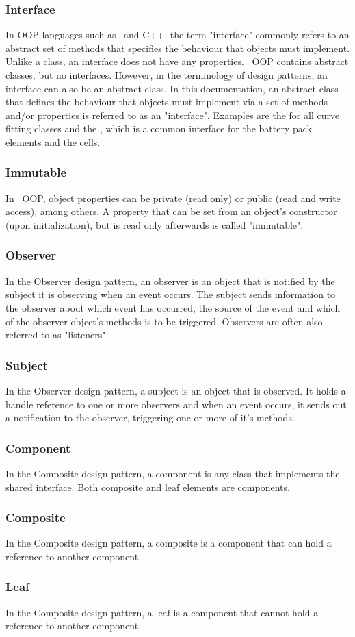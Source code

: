 \subsubsection*{Interface} \label{sec:interface}
In OOP languages such as \java\ and C++, the term "interface" commonly refers to an abstract set of methods that specifies the behaviour that objects must implement. Unlike a class, an interface does not have any properties. \matlab\ OOP contains abstract classes, but no interfaces. However, in the terminology of design patterns, an interface can also be an abstract class. In this documentation, an abstract class that defines the behaviour that objects must implement via a set of methods and/or properties is referred to as an "interface". Examples are the  for all curve fitting classes and the , which is a common interface for the battery pack elements and the cells.

\subsubsection*{Immutable}
In \matlab\ OOP, object properties can be private (read only) or public (read and write access), among others. A property that can be set from an object's constructor (upon initialization), but is read only afterwards is called "immutable".

\subsubsection*{Observer}
In the Observer design pattern, an observer is an object that is notified by the subject it is observing when an event occurs. The subject sends information to the observer about which event has occurred, the source of the event and which of the observer object's methods is to be triggered. Observers are often also referred to as "listeners".

\subsubsection*{Subject}
In the Observer design pattern, a subject is an object that is observed. It holds a handle reference to one or more observers and when an event occurs, it sends out a notification to the observer, triggering one or more of it's methods.

\subsubsection*{Component}
In the Composite design pattern, a component is any class that implements the shared interface. Both composite and leaf elements are components.

\subsubsection*{Composite}
In the Composite design pattern, a composite is a component that can hold a reference to another component.

\subsubsection*{Leaf}
In the Composite design pattern, a leaf is a component that cannot hold a reference to another component.